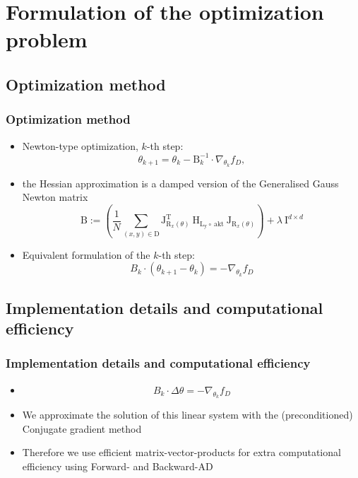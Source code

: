 


\beamertemplatenavigationsymbolsempty{}


\section{Formulation of the optimization problem}

  \subsection{Optimization method}
  \begin{frame}
  \frametitle{Optimization method}
  \begin{itemize}
  	\item Newton-type optimization, $k$-th step: 
  	$$\theta_{k+1} = \theta_{k} - \mathrm{B}_{k}^{-1}\cdot\nabla_{\theta_{k}} f_{D},$$%
  	\pause
  	\item[] the Hessian approximation is  a damped version of the Generalised Gauss Newton matrix 
  	$$\mathrm{B} := \left(\frac{1}{N}\sum_{(x, y)\in\mathrm{D}}^{}\mathrm{J}_{\mathrm{R}_{x}(\theta)}^{\mathrm{T}}\:\mathrm{H}_{\mathrm{L_{y}\circ\:\text{akt}}}\:\mathrm{J}_{\mathrm{R}_{x}(\theta)}\right) + \lambda\:\mathrm{I}^{d\times d} $$
  	\item Equivalent formulation of the $k$-th step:
  	$$B_{k}\cdot (\theta_{k+1} - \theta_{k}) = -\nabla_{\theta_{k}}f_{D}$$
  \end{itemize}
\end{frame}

\subsection{Implementation details and computational efficiency}
\begin{frame}
\frametitle{Implementation details and computational efficiency}
\begin{itemize}
	\item[] $$B_{k}\cdot \Delta\theta = -\nabla_{\theta_{k}}f_{D}$$
	\item We approximate the solution of this linear system with the (preconditioned) Conjugate gradient method
	\pause
	\item Therefore we use efficient matrix-vector-products for extra computational efficiency using Forward- and Backward-AD
\end{itemize}
\end{frame}
  
